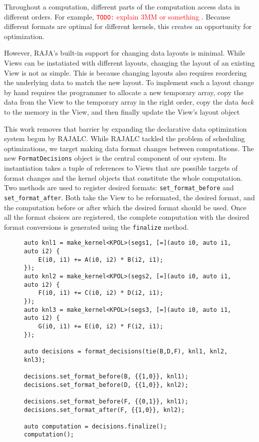 \documentclass[sigconf, table]{acmart}
\newcommand{\todo}[1]{{\textcolor{red}{{\tt{TODO:}}\,\,#1 }}}
\begin{document}
Throughout a computation, different parts of the computation access data in different orders.
For example, \todo{explain 3MM or something}.
Because different formats are optimal for different kernels, this creates an opportunity for optimization. 

However, RAJA's built-in support for changing data layouts is minimal. 
While Views can be instatiated with different layouts, changing the layout of an existing View is not as simple.
This is because changing layouts also requires reordering the underlying data to match the new layout. 
To implement such a layout change by hand requires the programmer to allocate a new temporary array, 
copy the data from the View to the temporary array in the right order, 
copy the data \textit{back} to the memory in the View, 
and then finally update the View's layout object

This work removes that barrier by expanding the declarative data optimization system begun by RAJALC.
While RAJALC tackled the problem of scheduling optimizations, we target making data format changes between computations. 
The new \verb.FormatDecisions. object is the central component of our system. 
Its instantiation takes a tuple of references to Views that are possible targets of format changes and the kernel objects that constitute the whole computation.
Two methods are used to register desired formats: \verb.set_format_before. and \verb.set_format_after..
Both take the View to be reformated, the desired format, and the computation before or after which the desired format should be used.
Once all the format choices are registered, the complete computation with the desired format conversions is generated using the \verb.finalize. method.


\begin{figure}
\begin{lstlisting}[caption={The 3MM benchmark implemented using FormatDecisions.},
	label={FormatDecisions3MM}]
auto knl1 = make_kernel<KPOL>(segs1, [=](auto i0, auto i1, auto i2) {
	E(i0, i1) += A(i0, i2) * B(i2, i1);
});
auto knl2 = make_kernel<KPOL>(segs2, [=](auto i0, auto i1, auto i2) {
	F(i0, i1) += C(i0, i2) * D(i2, i1);
});
auto knl3 = make_kernel<KPOL>(segs3, [=](auto i0, auto i1, auto i2) {
	G(i0, i1) += E(i0, i2) * F(i2, i1);
});

auto decisions = format_decisions(tie(B,D,F), knl1, knl2, knl3);

decisions.set_format_before(B, {{1,0}}, knl1);
decisions.set_format_before(D, {{1,0}}, knl2);

decisions.set_format_before(F, {{0,1}}, knl1);
decisions.set_format_after(F, {{1,0}}, knl2);

auto computation = decisions.finalize();
computation();
\end{lstlisting}
\end{figure}
\end{document}
